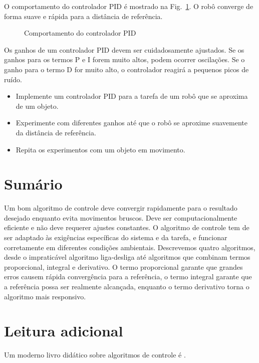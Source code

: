 O comportamento do controlador PID é mostrado na Fig.~\ref{fig.pid-control}. O robô converge de forma suave e rápida para a distância de referência. 

\begin{figure}
\begin{center}
\caption{Comportamento do controlador PID}\label{fig.pid-control}
\end{center}
\end{figure}

Os ganhos de um controlador PID devem ser cuidadosamente ajustados. Se os ganhos para os termos P e I forem muito altos, podem ocorrer oscilações. Se o ganho para o termo D for muito alto, o controlador reagirá a pequenos picos de ruído.

\begin{framed}
\begin{itemize}
\item Implemente um controlador PID para a tarefa de um robô que se aproxima de um objeto.
\item Experimente com diferentes ganhos até que o robô se aproxime suavemente da distância de referência.
\item Repita os experimentos com um objeto em movimento.
\end{itemize}
\end{framed}

\section{Sumário}

Um bom algoritmo de controle deve convergir rapidamente para o resultado desejado enquanto
evita movimentos bruscos. Deve ser computacionalmente eficiente e não deve requerer ajustes constantes. O algoritmo de controle tem de ser adaptado às exigências específicas do sistema e da tarefa, e funcionar corretamente em diferentes condições ambientais. Descrevemos quatro algoritmos, desde o impraticável algoritmo liga-desliga até algoritmos que combinam termos proporcional, integral e derivativo. O termo proporcional garante que grandes erros causem rápida convergência para a referência, o termo integral garante que a referência possa ser realmente alcançada, enquanto o termo derivativo torna o algoritmo mais responsivo. 

\section{Leitura adicional}

Um moderno livro didático sobre algoritmos de controle é \cite{astrom-murray}.
